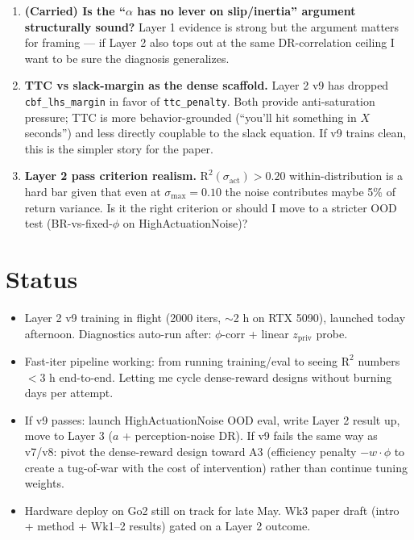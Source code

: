 \documentclass[11pt]{article}
\begin{document}
\begin{enumerate}
\item \textbf{(Carried) Is the ``$\alpha$ has no lever on slip/inertia'' argument structurally sound?} Layer 1 evidence is strong but the argument matters for framing --- if Layer 2 also tops out at the same DR-correlation ceiling I want to be sure the diagnosis generalizes.
\item \textbf{TTC vs slack-margin as the dense scaffold.} Layer 2 v9 has dropped \texttt{cbf\_lhs\_margin} in favor of \texttt{ttc\_penalty}. Both provide anti-saturation pressure; TTC is more behavior-grounded (``you'll hit something in $X$ seconds'') and less directly couplable to the slack equation. If v9 trains clean, this is the simpler story for the paper.
\item \textbf{Layer 2 pass criterion realism.} $\text{R}^2(\sigma_\text{act}) > 0.20$ within-distribution is a hard bar given that even at $\sigma_\text{max} = 0.10$ the noise contributes maybe 5\% of return variance. Is it the right criterion or should I move to a stricter OOD test (BR-vs-fixed-$\phi$ on HighActuationNoise)?
\end{enumerate}

\section*{Status}

\begin{itemize}
\item Layer 2 v9 training in flight (2000 iters, $\sim$2 h on RTX 5090), launched today afternoon. Diagnostics auto-run after: $\phi$-corr + linear $z_\text{priv}$ probe.
\item Fast-iter pipeline working: from running training/eval to seeing $\text{R}^2$ numbers $< 3$ h end-to-end. Letting me cycle dense-reward designs without burning days per attempt.
\item If v9 passes: launch HighActuationNoise OOD eval, write Layer 2 result up, move to Layer 3 ($a$ + perception-noise DR). If v9 fails the same way as v7/v8: pivot the dense-reward design toward A3 (efficiency penalty $-w \cdot \phi$ to create a tug-of-war with the cost of intervention) rather than continue tuning weights.
\item Hardware deploy on Go2 still on track for late May. Wk3 paper draft (intro + method + Wk1--2 results) gated on a Layer 2 outcome.
\end{itemize}
\end{document}
